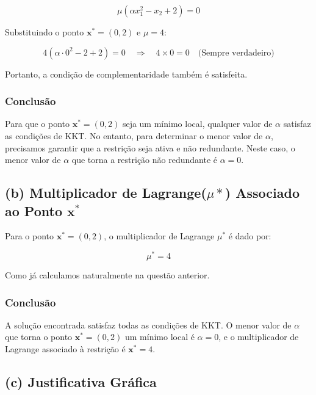 \documentclass[a4paper, 12pt]{article}
\begin{document}
\begin{equation*}
    \mu (\alpha x_1^2 - x_2 + 2) = 0
\end{equation*}

Substituindo o ponto $\mathbf{x}^* = (0, 2)$ e $\mu = 4$:

\begin{equation*}
    4 (\alpha \cdot 0^2 - 2 + 2) = 0 \quad \Rightarrow \quad 4 \times 0 = 0 \quad \text{(Sempre verdadeiro)}
\end{equation*}

Portanto, a condi\c{c}\~ao de complementaridade tamb\'em \'e satisfeita.

\subsubsection{Conclus\~ao }
Para que o ponto $\mathbf{x}^* = (0, 2)$ seja um m\'inimo local, qualquer valor de $\alpha$ satisfaz as condi\c{c}\~oes de KKT. No entanto, para determinar o menor valor de $\alpha$, precisamos garantir que a restri\c{c}\~ao seja ativa e n\~ao redundante. Neste caso, o menor valor de $\alpha$ que torna a restri\c{c}\~ao n\~ao redundante \'e $\alpha = 0$.

\subsection{(b) Multiplicador de Lagrange($\mu*$) Associado ao Ponto $\mathbf{x}^*$}

Para o ponto $\mathbf{x}^* = (0, 2)$, o multiplicador de Lagrange \(\mu^*\) \'e dado por:

\begin{equation*}
    \mu^* = 4
\end{equation*}

Como já calculamos naturalmente na questão anterior.

\subsubsection{Conclus\~ao}
A solu\c{c}\~ao encontrada satisfaz todas as condi\c{c}\~oes de KKT. O menor valor de $\alpha$ que torna o ponto $\mathbf{x}^* = (0, 2)$ um m\'inimo local \'e $\alpha = 0$, e o multiplicador de Lagrange associado \`a restri\c{c}\~ao \'e $\mathbf{x}^* = 4$.

\newpage
\subsection{(c) Justificativa Gráfica}
\end{document}
